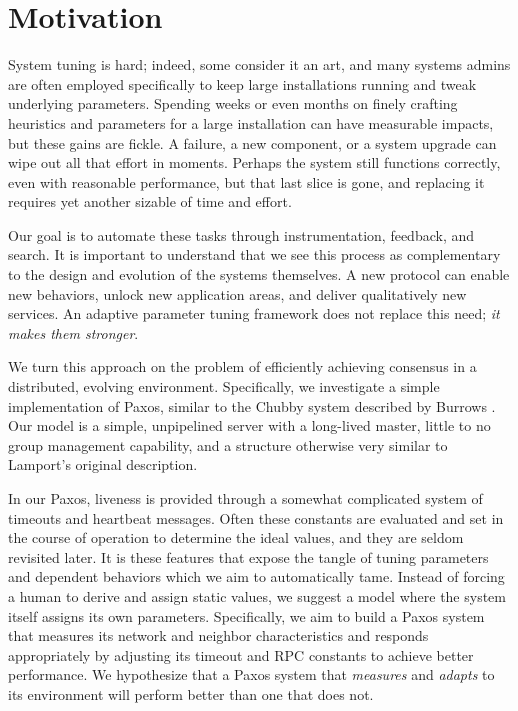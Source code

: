 
\section{Motivation}
System tuning is hard; indeed, some consider it an art, and many systems admins are often employed specifically to keep large installations running and tweak underlying parameters.
Spending weeks or even months on finely crafting heuristics and parameters for a large installation can have measurable impacts, but these gains are fickle.
A failure, a new component, or a system upgrade can wipe out all that effort in moments.
Perhaps the system still functions correctly, even with reasonable performance, but that last slice is gone, and replacing it requires yet another sizable of time and effort.

Our goal is to automate these tasks through instrumentation, feedback, and search.
It is important to understand that we see this process as complementary to the design and evolution of the systems themselves.
A new protocol can enable new behaviors, unlock new application areas, and deliver qualitatively new services.
An adaptive parameter tuning framework does not replace this need; \emph{it makes them stronger}.

We turn this approach on the problem of efficiently achieving consensus in a distributed, evolving environment.
Specifically, we investigate a simple implementation of Paxos, similar to the Chubby system described by Burrows \cite{burrows2006chubby}.
Our model is a simple, unpipelined server with a long-lived master, little to no group management capability, and a structure otherwise very similar to Lamport's original description.

In our Paxos, liveness is provided through a somewhat complicated system of timeouts and heartbeat messages.
Often these constants are evaluated and set in the course of operation to determine the ideal values, and they are seldom revisited later.
It is these features that expose the tangle of tuning parameters and dependent behaviors which we aim to automatically tame.
Instead of forcing a human to derive and assign static values, we suggest a model where the system itself assigns its own parameters.
Specifically, we aim to build a Paxos system that measures its network and neighbor characteristics and responds appropriately by adjusting its timeout and RPC constants to achieve better performance.
We hypothesize that a Paxos system that \emph{measures} and \emph{adapts} to its environment will perform better than one that does not.